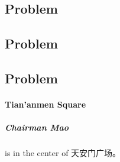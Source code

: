 \documentclass[17pt,UTF-8,a4paper]{ctexart}
\begin{document}
\subsection{Problem}

\subsection{Problem}

\subsection{Problem}



\paragraph{Tian'anmen Square}

\subparagraph{Chairman Mao}
is in the center of 天安门广场。
\end{document}
